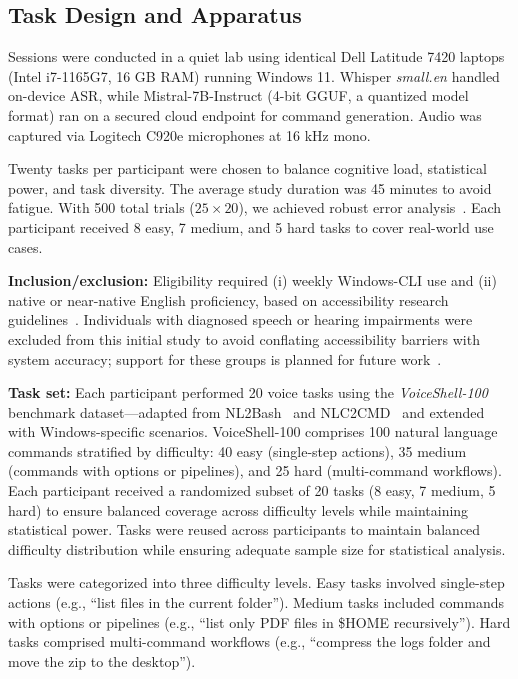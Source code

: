 \documentclass[a4paper,12pt]{article}
\begin{document}
\subsection{Task Design and Apparatus}
\noindent Sessions were conducted in a quiet lab using identical Dell Latitude 7420 laptops (Intel i7-1165G7, 16 GB RAM) running Windows 11. Whisper \textit{small.en} handled on-device ASR, while Mistral-7B-Instruct (4-bit GGUF, a quantized model format) ran on a secured cloud endpoint for command generation. Audio was captured via Logitech C920e microphones at 16 kHz mono.

\noindent Twenty tasks per participant were chosen to balance cognitive load, statistical power, and task diversity. The average study duration was 45 minutes to avoid fatigue. With 500 total trials ($25 \times 20$), we achieved robust error analysis~\cite{ref4}. Each participant received 8 easy, 7 medium, and 5 hard tasks to cover real-world use cases. 

\noindent\textbf{Inclusion/exclusion:} Eligibility required (i) weekly Windows-CLI use and (ii) native or near-native English proficiency, based on accessibility research guidelines~\cite{ref3}. Individuals with diagnosed speech or hearing impairments were excluded from this initial study to avoid conflating accessibility barriers with system accuracy; support for these groups is planned for future work~\cite{ref4}.

\noindent\textbf{Task set:} Each participant performed 20 voice tasks using the \textit{VoiceShell-100} benchmark dataset—adapted from NL2Bash~\cite{ref26} and NLC2CMD~\cite{ref27} and extended with Windows-specific scenarios. VoiceShell-100 comprises 100 natural language commands stratified by difficulty: 40 easy (single-step actions), 35 medium (commands with options or pipelines), and 25 hard (multi-command workflows). Each participant received a randomized subset of 20 tasks (8 easy, 7 medium, 5 hard) to ensure balanced coverage across difficulty levels while maintaining statistical power. Tasks were reused across participants to maintain balanced difficulty distribution while ensuring adequate sample size for statistical analysis.

Tasks were categorized into three difficulty levels. Easy tasks involved single-step actions (e.g., ``list files in the current folder''). Medium tasks included commands with options or pipelines (e.g., ``list only PDF files in \$HOME recursively''). Hard tasks comprised multi-command workflows (e.g., ``compress the logs folder and move the zip to the desktop'').
\end{document}
